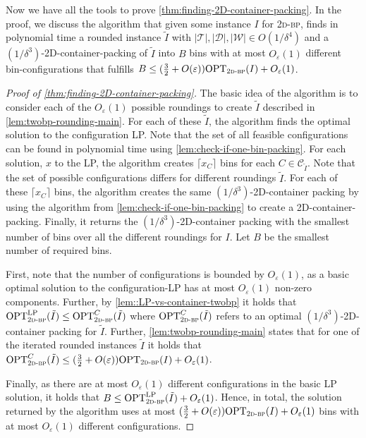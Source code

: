 \documentclass[a4paper,UKenglish,cleveref, autoref, thm-restate]{lipics-v2021}
\newcommand{\eps}{\varepsilon}
\newcommand{\opt}{\mathrm{OPT}}
\newcommand{\twobp}{\textsc{2d-bp}\xspace}
\begin{document}
Now we have all the tools to prove \cref{thm:finding-2D-container-packing}.
In the proof, we discuss the algorithm that 
given some instance $I$ for \twobp, finds in polynomial time a rounded instance $\tilde{I}$ with $|\mathcal{T}|, |\mathcal{D}|, |\mathcal{W}| \in O(1/\delta^4)$ and a $(1/\delta^3)$-2D-container-packing of $\tilde{I}$ into $B$ bins with at most $O_{\eps}(1)$ different bin-configurations that fulfills $B \leq (\frac{3}{2}+O(\eps))\opt_{\twobp}(I) +O_{\eps}(1)$.



\begin{proof}[Proof of \cref{thm:finding-2D-container-packing}]
The basic idea of the algorithm is to consider each of the $O_{\eps}(1)$ possible roundings to create $\tilde{I}$ described in \cref{lem:twobp-rounding-main}.
For each of these $\tilde{I}$, the algorithm finds the optimal solution to the configuration LP. 
Note that the set of all feasible configurations can be found in polynomial time using \cref{lem:check-if-one-bin-packing}.
For each solution, $x$ to the LP, the algorithm creates $\lceil x_C\rceil$ bins for each $C \in \mathcal{C}_{\tilde{I}}$.
Note that the set of possible configurations differs for different roundings $\tilde{I}$.
For each of these $\lceil x_C\rceil$ bins, the algorithm creates the same $(1/\delta^3)$-2D-container packing by using the algorithm from  \cref{lem:check-if-one-bin-packing} to create a 2D-container-packing.
Finally, it returns the $(1/\delta^3)$-2D-container packing with the smallest number of bins over all the different roundings for $I$.
Let $B$ be the smallest number of required bins.

First, note that the number of configurations is bounded by $O_{\eps}(1)$, as a basic optimal solution to the configuration-LP has at most $O_{\eps}(1)$ non-zero components.
Further, by \cref{lem::LP-vs-container-twobp} it holds that $\opt_{\twobp}^{\text{LP}}(\tilde{I}) \leq \opt_{\twobp}^{C}(\tilde{I})$ where $\opt_{\twobp}^{C}(\tilde{I})$ refers to an optimal $(1/\delta^3)$-2D-container packing for $\tilde{I}$.
Further, \cref{lem:twobp-rounding-main} states that for one of the iterated rounded instances $\tilde{I}$ it holds that $\opt_{\twobp}^{C}(\tilde{I}) \leq (\frac32+{O}(\eps))\opt_{\twobp}(I) + {O}_{\eps}(1)$.

Finally, as there are at most $O_{\eps}(1)$ different configurations in the basic LP solution, it holds that $B \leq \opt_{\twobp}^{\text{LP}}(\tilde{I}) +O_{\eps}(1)$.
Hence, in total, the solution returned by the algorithm uses at most $(\frac32+{O}(\eps))\opt_{\twobp}(I) + {O}_{\eps}(1)$ bins with at most $O_{\eps}(1)$ different configurations.
\end{proof}
\end{document}
